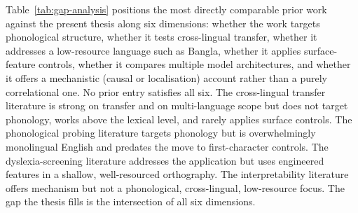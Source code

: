 Table~\ref{tab:gap-analysis} positions the most directly comparable prior work against the present thesis along six dimensions: whether the work targets phonological structure, whether it tests cross-lingual transfer, whether it addresses a low-resource language such as Bangla, whether it applies surface-feature controls, whether it compares multiple model architectures, and whether it offers a mechanistic (causal or localisation) account rather than a purely correlational one. No prior entry satisfies all six. The cross-lingual transfer literature \cite{pires2019mbert,wu2020emerging,conneau2020xlmr,k2020crosslingual,artetxe2020crosslingual} is strong on transfer and on multi-language scope but does not target phonology, works above the lexical level, and rarely applies surface controls. The phonological probing literature \cite{kann2018phonological,chrupala2019phonological,soulos2021structural} targets phonology but is overwhelmingly monolingual English and predates the move to first-character controls. The dyslexia-screening literature \cite{rello2016dytective} addresses the application but uses engineered features in a shallow, well-resourced orthography. The interpretability literature \cite{stanczak2022neurons,bricken2023monosemanticity,vig2020investigating} offers mechanism but not a phonological, cross-lingual, low-resource focus. The gap the thesis fills is the intersection of all six dimensions.

